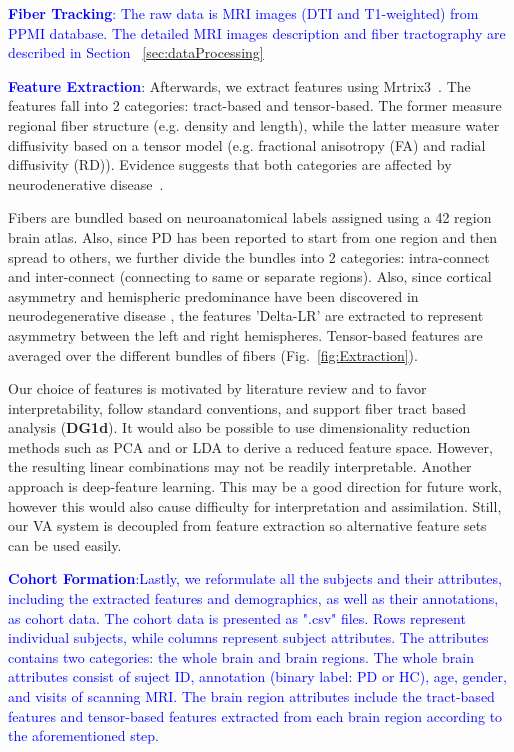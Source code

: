 \textcolor{blue}{\textbf{Fiber Tracking}:  The raw data is MRI images (DTI and T1-weighted) from PPMI database. The detailed MRI images description and fiber tractography are described in Section ~\ref{sec:dataProcessing} }

\textcolor{blue}{\textbf{Feature Extraction}}: Afterwards, we extract features using Mrtrix3~\cite{TOURNIER2019116137}. The features fall into 2 categories: tract-based and tensor-based. The former measure regional fiber structure (e.g. density and length), while the latter measure water diffusivity based on a tensor model (e.g. fractional anisotropy (FA) 
and radial diffusivity (RD)). Evidence suggests that both categories are affected by neurodenerative disease~\cite{sundaram2008diffusion,ji2015white}.

Fibers are bundled based on neuroanatomical labels assigned using a 42 region brain atlas. Also, since PD has been reported to start from one region and then spread to others, 
we further divide the bundles into 2 categories: intra-connect and inter-connect (connecting to same or separate regions). Also, since cortical asymmetry and hemispheric predominance have been discovered in neurodegenerative disease \cite{scherfler2012left}, the features 'Delta-LR' are extracted to represent asymmetry between the left and right hemispheres. Tensor-based features are averaged over the different bundles of fibers (Fig.~\ref{fig:Extraction}).

Our choice of features is motivated by literature review and to favor interpretability, follow standard conventions, and support fiber tract based analysis (\textbf{DG1d}). It would also be possible to use dimensionality reduction methods such as PCA and or LDA to derive a reduced feature space. However, the resulting linear combinations may not be readily interpretable. Another approach is deep-feature learning. This may be a good direction for future work, however this would also cause difficulty for interpretation and assimilation. Still, our VA system is decoupled from feature extraction so alternative feature sets can be used easily.

\textcolor{blue}{\textbf{Cohort Formation}:Lastly, we reformulate all the subjects and their attributes, including the extracted features and demographics, as well as their annotations, as cohort data. The cohort data is presented as ".csv" files. Rows represent individual subjects, while columns represent subject attributes. The attributes contains two categories: the whole brain and brain regions. The whole brain attributes consist of suject ID, annotation (binary label: PD or 
HC), age, gender, and visits of scanning MRI. The brain region attributes include the tract-based features and tensor-based features extracted from each brain region according to the aforementioned step.}

